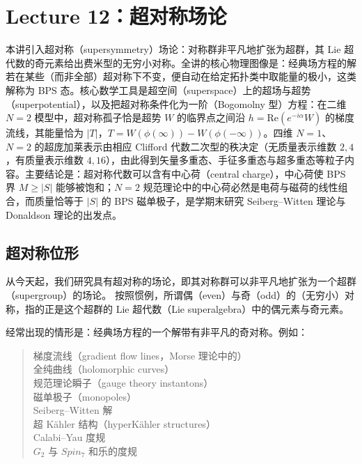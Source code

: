 \section{Lecture 12：超对称场论}

\begin{keytakeaways}
本讲引入超对称（supersymmetry）场论：对称群非平凡地扩张为超群，其 Lie 超代数的奇元素给出费米型的无穷小对称。全讲的核心物理图像是：经典场方程的解若在某些（而非全部）超对称下不变，便自动在给定拓扑类中取能量的极小，这类解称为 BPS 态。核心数学工具是超空间（superspace）上的超场与超势（superpotential），以及把超对称条件化为一阶（Bogomolny 型）方程：在二维 $N=2$ 模型中，超对称孤子恰是超势 $W$ 的临界点之间沿 $h=\mathrm{Re}(e^{-i\alpha}W)$ 的梯度流线，其能量恰为 $|T|$，$T=W(\phi(\infty))-W(\phi(-\infty))$。四维 $N=1$、$N=2$ 的超庞加莱表示由相应 Clifford 代数二次型的秩决定（无质量表示维数 $2,4$，有质量表示维数 $4,16$），由此得到矢量多重态、手征多重态与超多重态等粒子内容。主要结论是：超对称代数可以含有中心荷（central charge），中心荷使 BPS 界 $M\ge|S|$ 能够被饱和；$N=2$ 规范理论中的中心荷必然是电荷与磁荷的线性组合，而质量恰等于 $|S|$ 的 BPS 磁单极子，是学期末研究 Seiberg--Witten 理论与 Donaldson 理论的出发点。
\end{keytakeaways}

\subsection{超对称位形}

从今天起，我们研究具有超对称的场论，即其对称群可以非平凡地扩张为一个超群（supergroup）的场论。
按照惯例，所谓偶（even）与奇（odd）的（无穷小）对称，指的正是这个超群的 Lie 超代数（Lie superalgebra）中的偶元素与奇元素。

经常出现的情形是：经典场方程的一个解带有非平凡的奇对称。例如：

\begin{quote}
\noindent 梯度流线（gradient flow lines，Morse 理论中的）\\
\noindent 全纯曲线（holomorphic curves）\\
\noindent 规范理论瞬子（gauge theory instantons）\\
\noindent 磁单极子（monopoles）\\
\noindent Seiberg--Witten 解\\
\noindent 超 Kähler 结构（hyperKähler structures）\\
\noindent Calabi--Yau 度规\\
\noindent $G_2$ 与 $Spin_7$ 和乐的度规
\end{quote}

